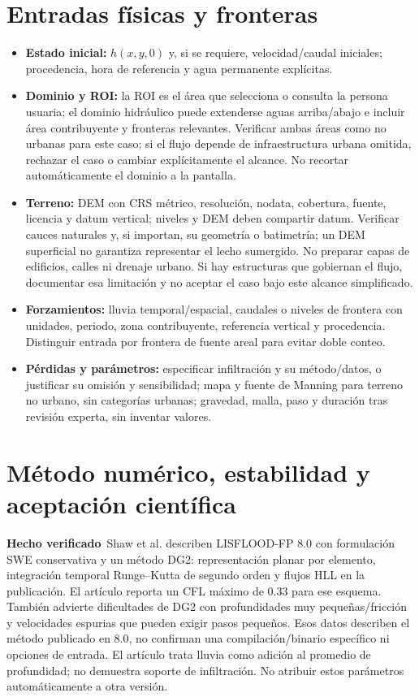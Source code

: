 \documentclass[11pt,a4paper]{article}
\newcommand{\hecho}{\textbf{Hecho verificado}}
\begin{document}
\section{Entradas físicas y fronteras}
\begin{itemize}
\item \textbf{Estado inicial:} $h(x,y,0)$ y, si se requiere, velocidad/caudal iniciales; procedencia, hora de referencia y agua permanente explícitas.
\item \textbf{Dominio y ROI:} la ROI es el área que selecciona o consulta la persona usuaria; el dominio hidráulico puede extenderse aguas arriba/abajo e incluir área contribuyente y fronteras relevantes. Verificar ambas áreas como no urbanas para este caso; si el flujo depende de infraestructura urbana omitida, rechazar el caso o cambiar explícitamente el alcance. No recortar automáticamente el dominio a la pantalla.
\item \textbf{Terreno:} DEM con CRS métrico, resolución, nodata, cobertura, fuente, licencia y datum vertical; niveles y DEM deben compartir datum. Verificar cauces naturales y, si importan, su geometría o batimetría; un DEM superficial no garantiza representar el lecho sumergido. No preparar capas de edificios, calles ni drenaje urbano. Si hay estructuras que gobiernan el flujo, documentar esa limitación y no aceptar el caso bajo este alcance simplificado.
\item \textbf{Forzamientos:} lluvia temporal/espacial, caudales o niveles de frontera con unidades, periodo, zona contribuyente, referencia vertical y procedencia. Distinguir entrada por frontera de fuente areal para evitar doble conteo.
\item \textbf{Pérdidas y parámetros:} especificar infiltración y su método/datos, o justificar su omisión y sensibilidad; mapa y fuente de Manning para terreno no urbano, sin categorías urbanas; gravedad, malla, paso y duración tras revisión experta, sin inventar valores.
\end{itemize}

\section{Método numérico, estabilidad y aceptación científica}
\hecho\ Shaw et al. describen LISFLOOD-FP 8.0 con formulación SWE conservativa y un método DG2: representación planar por elemento, integración temporal Runge--Kutta de segundo orden y flujos HLL en la publicación. El artículo reporta un CFL máximo de 0.33 para ese esquema. También advierte dificultades de DG2 con profundidades muy pequeñas/fricción y velocidades espurias que pueden exigir pasos pequeños. Esos datos describen el método publicado en 8.0, no confirman una compilación/binario específico ni opciones de entrada. El artículo trata lluvia como adición al promedio de profundidad; no demuestra soporte de infiltración. No atribuir estos parámetros automáticamente a otra versión.
\end{document}
